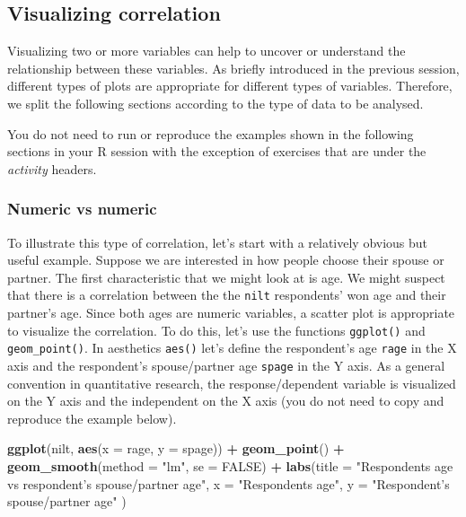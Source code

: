 \documentclass[
]{book}
\newenvironment{Shaded}{\begin{snugshade}}{\end{snugshade}}
\newcommand{\AttributeTok}[1]{\textcolor[rgb]{0.13,0.29,0.53}{#1}}
\newcommand{\ConstantTok}[1]{\textcolor[rgb]{0.56,0.35,0.01}{#1}}
\newcommand{\FunctionTok}[1]{\textcolor[rgb]{0.13,0.29,0.53}{\textbf{#1}}}
\newcommand{\NormalTok}[1]{#1}
\newcommand{\SpecialCharTok}[1]{\textcolor[rgb]{0.81,0.36,0.00}{\textbf{#1}}}
\newcommand{\StringTok}[1]{\textcolor[rgb]{0.31,0.60,0.02}{#1}}
\begin{document}
\hypertarget{visualizing-correlation}{%
\subsection{Visualizing correlation}\label{visualizing-correlation}}

Visualizing two or more variables can help to uncover or understand the relationship between these variables. As briefly introduced in the previous session, different types of plots are appropriate for different types of variables. Therefore, we split the following sections according to the type of data to be analysed.

You do not need to run or reproduce the examples shown in the following sections in your R session with the exception of exercises that are under the \emph{activity} headers.

\hypertarget{numeric-vs-numeric}{%
\subsubsection{Numeric vs numeric}\label{numeric-vs-numeric}}

To illustrate this type of correlation, let's start with a relatively obvious but useful example. Suppose we are interested in how people choose their spouse or partner. The first characteristic that we might look at is age. We might suspect that there is a correlation between the the \texttt{nilt} respondents' won age and their partner's age. Since both ages are numeric variables, a scatter plot is appropriate to visualize the correlation. To do this, let's use the functions \texttt{ggplot()} and \texttt{geom\_point()}. In aesthetics \texttt{aes()} let's define the respondent's age \texttt{rage} in the X axis and the respondent's spouse/partner age \texttt{spage} in the Y axis. As a general convention in quantitative research, the response/dependent variable is visualized on the Y axis and the independent on the X axis (you do not need to copy and reproduce the example below).

\begin{Shaded}
\begin{Highlighting}[]
\FunctionTok{ggplot}\NormalTok{(nilt, }\FunctionTok{aes}\NormalTok{(}\AttributeTok{x =}\NormalTok{ rage, }\AttributeTok{y =}\NormalTok{ spage)) }\SpecialCharTok{+} 
  \FunctionTok{geom\_point}\NormalTok{() }\SpecialCharTok{+}
  \FunctionTok{geom\_smooth}\NormalTok{(}\AttributeTok{method =} \StringTok{"lm"}\NormalTok{, }\AttributeTok{se =} \ConstantTok{FALSE}\NormalTok{) }\SpecialCharTok{+}
  \FunctionTok{labs}\NormalTok{(}\AttributeTok{title =} \StringTok{"Respondent\textquotesingle{}s age vs respondent’s spouse/partner age"}\NormalTok{, }
       \AttributeTok{x =} \StringTok{"Respondent\textquotesingle{}s age"}\NormalTok{, }\AttributeTok{y =} \StringTok{"Respondent’s spouse/partner age"}\NormalTok{ )}
\end{Highlighting}
\end{Shaded}
\end{document}
